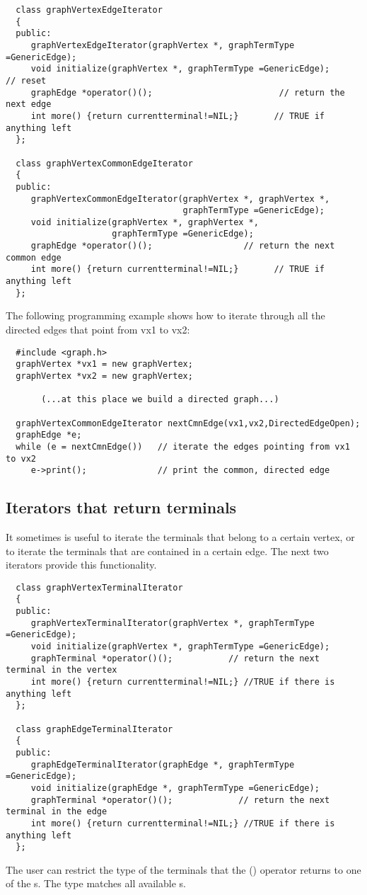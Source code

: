 {\footnotesize \begin{verbatim}
  class graphVertexEdgeIterator
  {
  public:
     graphVertexEdgeIterator(graphVertex *, graphTermType =GenericEdge);
     void initialize(graphVertex *, graphTermType =GenericEdge);     // reset
     graphEdge *operator()();                         // return the next edge
     int more() {return currentterminal!=NIL;}       // TRUE if anything left
  };
  
  class graphVertexCommonEdgeIterator
  {
  public:
     graphVertexCommonEdgeIterator(graphVertex *, graphVertex *,
                                   graphTermType =GenericEdge);
     void initialize(graphVertex *, graphVertex *,
                     graphTermType =GenericEdge);
     graphEdge *operator()();                  // return the next common edge
     int more() {return currentterminal!=NIL;}       // TRUE if anything left
  };
\end{verbatim}}

The following programming example shows how to iterate through all the directed
edges that point from vx1 to vx2:

{\footnotesize \begin{verbatim}
  #include <graph.h>
  graphVertex *vx1 = new graphVertex;
  graphVertex *vx2 = new graphVertex;

       (...at this place we build a directed graph...)

  graphVertexCommonEdgeIterator nextCmnEdge(vx1,vx2,DirectedEdgeOpen);
  graphEdge *e;
  while (e = nextCmnEdge())   // iterate the edges pointing from vx1 to vx2
     e->print();              // print the common, directed edge
\end{verbatim}}

\subsection{Iterators that return terminals}
\label{s-terminal-itr}
It sometimes is useful to iterate the terminals that belong to a certain
vertex, or to iterate the terminals that are contained in a certain edge. The
next two iterators provide this functionality.

{\footnotesize \begin{verbatim}
  class graphVertexTerminalIterator
  {
  public:
     graphVertexTerminalIterator(graphVertex *, graphTermType =GenericEdge);
     void initialize(graphVertex *, graphTermType =GenericEdge);
     graphTerminal *operator()();           // return the next terminal in the vertex
     int more() {return currentterminal!=NIL;} //TRUE if there is anything left
  };
  
  class graphEdgeTerminalIterator
  {
  public:
     graphEdgeTerminalIterator(graphEdge *, graphTermType =GenericEdge);
     void initialize(graphEdge *, graphTermType =GenericEdge);
     graphTerminal *operator()();             // return the next terminal in the edge
     int more() {return currentterminal!=NIL;} //TRUE if there is anything left
  };
\end{verbatim}}

The user can restrict the type of the terminals that the () operator returns to
one of the s. The type  matches all
available s.


